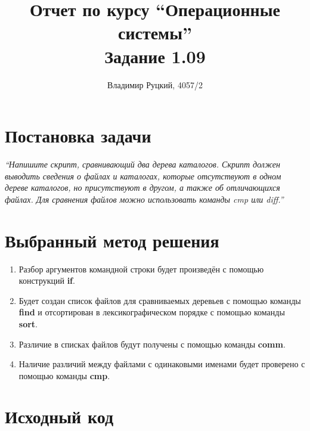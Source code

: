 \documentclass[a4paper,12pt]{article}
\title{Отчет по курсу ``Операционные системы'' \\ Задание 1.09}
\author{Владимир Руцкий, 4057/2}
\newcommand{\commandquote}[1]{\textbf{#1}}
\begin{document}
\maketitle

\section*{Постановка задачи}
\textit{``Напишите скрипт, сравнивающий два дерева каталогов. Скрипт должен
выводить сведения о файлах и каталогах, которые отсутствуют в одном дереве
каталогов, но присутствуют в другом, а также об отличающихся файлах. Для
сравнения файлов можно использовать команды cmp или diff.''}

\section*{Выбранный метод решения}
\begin{enumerate}
 \item Разбор аргументов командной строки будет произведён с помощью конструкций \commandquote{if}.
 \item Будет создан список файлов для сравниваемых деревьев с помощью команды \commandquote{find} и 
отсортирован в лексикографическом порядке с помощью команды \commandquote{sort}.
 \item Различие в списках файлов будут получены с помощью команды \commandquote{comm}.
 \item Наличие различий между файлами с одинаковыми именами будет проверено с помощью команды \commandquote{cmp}.
\end{enumerate}

\pagebreak
\section*{Исходный код}
\lstset{language=bash, caption=task\_1\_09.sh,%
label=source-code, basicstyle=\footnotesize,%
numbers=left, numberstyle=\footnotesize, numbersep=5pt, frame=single, breaklines=true, breakatwhitespace=false,%
inputencoding=utf8x}

\end{document}
